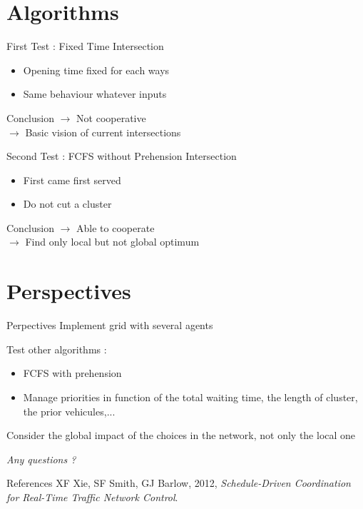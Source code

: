 \documentclass[]{beamer}
\begin{document}
\section{Algorithms}
\begin{frame}{First Test : Fixed Time Intersection}
 \begin{itemize}
  \item Opening time fixed for each ways
  \item Same behaviour whatever inputs
 \end{itemize}
 \begin{block}{Conclusion}
  $\rightarrow$ Not cooperative\\
  $\rightarrow$ Basic vision of current intersections
 \end{block}
\end{frame}


\begin{frame}{Second Test : FCFS without Prehension Intersection}
 \begin{itemize}
  \item First came first served
  \item Do not cut a cluster
 \end{itemize}
 \begin{block}{Conclusion}
  $\rightarrow$ Able to cooperate\\
  $\rightarrow$ Find only local but not global optimum
 \end{block}
\end{frame}


\section{Perspectives}
\begin{frame}{Perpectives}
Implement grid with several agents\vspace{0.5cm}

Test other algorithms :
 \begin{itemize}
  \item FCFS with prehension
  \item Manage priorities in function of the total waiting time, the length of cluster, the prior vehicules,...
 \end{itemize}
 \vspace{0.5cm}
 Consider the global impact of the choices in the network, not only the local one
\end{frame}


\begin{frame}
\centering \LARGE
  \emph{Any questions ?}
\end{frame}


\begin{frame}{References}
XF Xie, SF Smith, GJ Barlow, 2012, \emph{Schedule-Driven Coordination for Real-Time Traffic Network Control}.
\end{frame}
\end{document}
